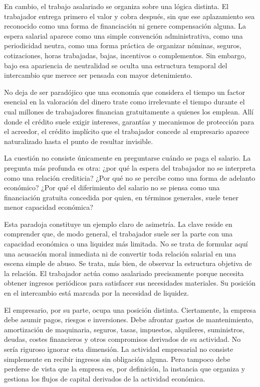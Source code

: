 \documentclass[12pt,a4paper]{article}
\begin{document}
En cambio, el trabajo asalariado se organiza sobre una lógica distinta. El trabajador entrega primero el valor y cobra después, sin que ese aplazamiento sea reconocido como una forma de financiación ni genere compensación alguna. La espera salarial aparece como una simple convención administrativa, como una periodicidad neutra, como una forma práctica de organizar nóminas, seguros, cotizaciones, horas trabajadas, bajas, incentivos o complementos. Sin embargo, bajo esa apariencia de neutralidad se oculta una estructura temporal del intercambio que merece ser pensada con mayor detenimiento.

No deja de ser paradójico que una economía que considera el tiempo un factor esencial en la valoración del dinero trate como irrelevante el tiempo durante el cual millones de trabajadores financian gratuitamente a quienes los emplean. Allí donde el crédito suele exigir intereses, garantías y mecanismos de protección para el acreedor, el crédito implícito que el trabajador concede al empresario aparece naturalizado hasta el punto de resultar invisible.

La cuestión no consiste únicamente en preguntarse cuándo se paga el salario. La pregunta más profunda es otra: ¿por qué la espera del trabajador no se interpreta como una relación crediticia? ¿Por qué no se percibe como una forma de adelanto económico? ¿Por qué el diferimiento del salario no se piensa como una financiación gratuita concedida por quien, en términos generales, suele tener menor capacidad económica?

Esta paradoja constituye un ejemplo claro de asimetría. La clave reside en comprender que, de modo general, el trabajador suele ser la parte con una capacidad económica o una liquidez más limitada. No se trata de formular aquí una acusación moral inmediata ni de convertir toda relación salarial en una escena simple de abuso. Se trata, más bien, de observar la estructura objetiva de la relación. El trabajador actúa como asalariado precisamente porque necesita obtener ingresos periódicos para satisfacer sus necesidades materiales. Su posición en el intercambio está marcada por la necesidad de liquidez.

El empresario, por su parte, ocupa una posición distinta. Ciertamente, la empresa debe asumir pagos, riesgos e inversiones. Debe afrontar gastos de mantenimiento, amortización de maquinaria, seguros, tasas, impuestos, alquileres, suministros, deudas, costes financieros y otros compromisos derivados de su actividad. No sería riguroso ignorar esta dimensión. La actividad empresarial no consiste simplemente en recibir ingresos sin obligación alguna. Pero tampoco debe perderse de vista que la empresa es, por definición, la instancia que organiza y gestiona los flujos de capital derivados de la actividad económica.
\end{document}
